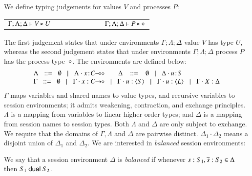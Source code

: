 \noi We define typing judgements for values $V$ and processes $P$:
%
\begin{center}
	\begin{tabular}{c}
		$\Gamma; \Lambda; \Delta \vdash V \triangleright U \qquad \qquad \qquad \qquad \Gamma; \Lambda; \Delta \vdash P \triangleright \diamond$
	\end{tabular}
\end{center}
%
\noi The first judgement states that under environments $\Gamma; \Lambda; \Delta$ value $V$
has type $U$, whereas the second judgement states that under
environments $\Gamma; \Lambda; \Delta$ process $P$ has the process type~$\diamond$. The environments are defined below:
%
\[
	\begin{array}{l}
		\Lambda \bnfis  \emptyset \bnfbar \Lambda \cat \AT{x}{\lhot{C}}
		\quad\quad \Delta  \ \bnfis  \ \emptyset \bnfbar \Delta \cat \AT{u}{S}
		\\
		\Gamma  \bnfis  \emptyset \bnfbar \Gamma \cat \varp{x}: \shot{C} \bnfbar \Gamma \cat u: \chtype{S} \bnfbar \Gamma \cat u: \chtype{L} 
		\bnfbar \Gamma \cat \rvar{X}: \Delta
	\end{array}
\]
%
\noi 
$\Gamma$ maps variables and shared names to value types, and recursive 
variables to session environments;  
it admits weakening, contraction, and exchange principles.
$\Lambda$ is a mapping from variables to 
linear
higher-order
types; and $\Delta$ is a mapping from 
session names to session types. 
Both $\Lambda$ and $\Delta$
are
only subject to exchange.  
We require that the domains of $\Gamma,
\Lambda$ and $\Delta$ are pairwise distinct. 
$\Delta_1\cdot \Delta_2$ means 
a disjoint union of $\Delta_1$ and $\Delta_2$.  
We are interested in \emph{balanced} session environments: 


\begin{definition}[Balanced]\label{d:wtenv}%
	We say that a session environment $\Delta$ is {\em balanced} if whenever
	$s: S_1, \overline{s}: S_2 \in \Delta$ then $S_1 \ \mathsf{dual}\  S_2$.
\end{definition}

